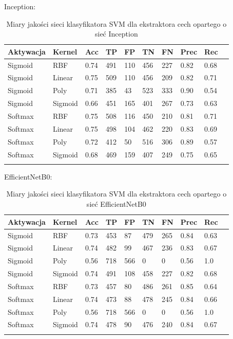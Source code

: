 \documentclass[polish,12pt]{aghthesis}
\begin{document}
\noindent Inception:
 \begin{longtable}[h!]{|m{1.9cm}|m{1.5cm}|m{1.2cm}|m{1.2cm}|m{1.2cm}|m{1.2cm}|m{1.2cm}|m{1.2cm}|m{1.2cm}|m{1.2cm}|}
 \hline
 Aktywacja & Kernel & Acc & TP & FP & TN & FN & Prec & Rec\\
 \hline
 Sigmoid & RBF & 0.74 & 491 & 110 & 456 & 227 & 0.82 & 0.68\\
 \hline
 Sigmoid & Linear & 0.75 & 509 & 110 & 456 & 209 & 0.82 & 0.71\\
 \hline
 Sigmoid & Poly & 0.71 & 385 & 43 & 523 & 333 & 0.90 & 0.54\\
 \hline
 Sigmoid & Sigmoid & 0.66 & 451 & 165 & 401 & 267 & 0.73 & 0.63\\
 \hline
 Softmax & RBF & 0.75 & 508 & 116 & 450 & 210 & 0.81 & 0.71\\
 \hline
 Softmax & Linear & 0.75 & 498 & 104 & 462 & 220 & 0.83 & 0.69\\
 \hline
 Softmax & Poly & 0.72 & 412 & 50 & 516 & 306 & 0.89 & 0.57\\
 \hline
 Softmax & Sigmoid & 0.68 & 469 & 159 & 407 & 249 & 0.75 & 0.65\\
 \hline
\caption{Miary jakości sieci klasyfikatora SVM dla ekstraktora cech opartego o sieć Inception}
\label{table:15}
\end{longtable}

\noindent EfficientNetB0:
 \begin{longtable}[h!]{|m{1.9cm}|m{1.5cm}|m{1.2cm}|m{1.2cm}|m{1.2cm}|m{1.2cm}|m{1.2cm}|m{1.2cm}|m{1.2cm}|m{1.2cm}|}
 \hline
 Aktywacja & Kernel & Acc & TP & FP & TN & FN & Prec & Rec\\
 \hline
 Sigmoid & RBF & 0.73 & 453 & 87 & 479 & 265 & 0.84 & 0.63\\
 \hline
 Sigmoid & Linear & 0.74 & 482 & 99 & 467 & 236 & 0.83 & 0.67\\
 \hline
 Sigmoid & Poly & 0.56 & 718 & 566 & 0 & 0 & 0.56 & 1.0\\
 \hline
 Sigmoid & Sigmoid & 0.74 & 491 & 108 & 458 & 227 & 0.82 & 0.68\\
 \hline
 Softmax & RBF & 0.73 & 457 & 80 & 486 & 261 & 0.85 & 0.64\\
 \hline
 Softmax & Linear & 0.74 & 473 & 88 & 478 & 245 & 0.84 & 0.66\\
 \hline
 Softmax & Poly & 0.56 & 718 & 566 & 0 & 0 & 0.56 & 1.0\\
 \hline
 Softmax & Sigmoid & 0.74 & 478 & 90 & 476 & 240 & 0.84 & 0.67\\
 \hline
\caption{Miary jakości sieci klasyfikatora SVM dla ekstraktora cech opartego o sieć EfficientNetB0}
\label{table:16}
\end{longtable}
\end{document}
